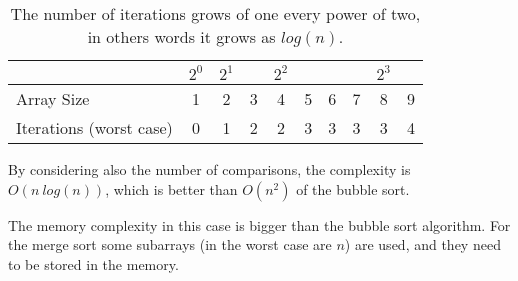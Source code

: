 \begin{table}[H]
\caption[Merge Sort Complexity.]{The number of iterations grows of one every power of two, in others words it grows as \(log(n)\).}
\label{mergesortefficiency}
\centering
\begin{tabular}{ | l | c | c | c | c | c | c | c | c | c |}
   
    \multicolumn{1}{l}{} & \multicolumn{1}{c}{\(2^{0}\)} & 
    \multicolumn{1}{c}{\(2^{1}\)} & \multicolumn{1}{c}{} &
    \multicolumn{1}{c}{\(2^{2}\)} & \multicolumn{1}{c}{} & 
    \multicolumn{1}{c}{} & \multicolumn{1}{c}{}          & 
    \multicolumn{1}{c}{\(2^{3}\)} & \multicolumn{1}{c}{} \\
    \hline
	Array Size & \cellcolor{LightCyan} 1 & \cellcolor{LightCyan} 2 & 3 & \cellcolor{LightCyan} 4 & 5  & 6 & 7 & \cellcolor{LightCyan} 8 & 9 \\
    \hline
	Iterations (worst case) & \cellcolor{LightCyan} 0 & \cellcolor{LightCyan} 1 & 2 & \cellcolor{LightCyan} 2 & 3 & 3 & 3 & \cellcolor{LightCyan} 3 & 4 \\
	\hline	
\end{tabular}
\end{table}

By considering also the number of comparisons, the complexity is \(O(n \ log(n))\), which is better than \(O(n^{2})\) of the bubble sort. 

The memory complexity in this case is bigger than the bubble sort algorithm. For the merge sort some subarrays (in the worst case are \(n\)) are used, and they need to be stored in the memory.

